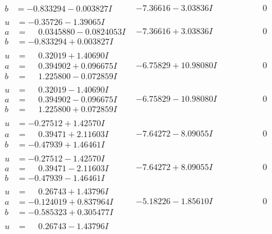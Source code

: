 \documentclass[1p]{elsarticle_modified}
\theoremstyle{definition}
\begin{document}
$$\begin{array}{c|c|c}
\begin{aligned}
b &= -0.833294 - 0.003827 I\end{aligned}
 & -7.36616 - 3.03836 I & \phantom{-0.000000 } 0 \\ \hline\begin{aligned}
u &= -0.35726 - 1.39065 I \\
a &= \phantom{-}0.0345880 - 0.0824053 I \\
b &= -0.833294 + 0.003827 I\end{aligned}
 & -7.36616 + 3.03836 I & \phantom{-0.000000 } 0 \\ \hline\begin{aligned}
u &= \phantom{-}0.32019 + 1.40690 I \\
a &= \phantom{-}0.394902 + 0.096675 I \\
b &= \phantom{-}1.225800 - 0.072859 I\end{aligned}
 & -6.75829 + 10.98080 I & \phantom{-0.000000 } 0 \\ \hline\begin{aligned}
u &= \phantom{-}0.32019 - 1.40690 I \\
a &= \phantom{-}0.394902 - 0.096675 I \\
b &= \phantom{-}1.225800 + 0.072859 I\end{aligned}
 & -6.75829 - 10.98080 I & \phantom{-0.000000 } 0 \\ \hline\begin{aligned}
u &= -0.27512 + 1.42570 I \\
a &= \phantom{-}0.39471 + 2.11603 I \\
b &= -0.47939 + 1.46461 I\end{aligned}
 & -7.64272 - 8.09055 I & \phantom{-0.000000 } 0 \\ \hline\begin{aligned}
u &= -0.27512 - 1.42570 I \\
a &= \phantom{-}0.39471 - 2.11603 I \\
b &= -0.47939 - 1.46461 I\end{aligned}
 & -7.64272 + 8.09055 I & \phantom{-0.000000 } 0 \\ \hline\begin{aligned}
u &= \phantom{-}0.26743 + 1.43796 I \\
a &= -0.124019 + 0.837964 I \\
b &= -0.585323 + 0.305477 I\end{aligned}
 & -5.18226 - 1.85610 I & \phantom{-0.000000 } 0 \\ \hline\begin{aligned}
u &= \phantom{-}0.26743 - 1.43796 I \\

\end{aligned}
\end{array}$$
\end{document}

